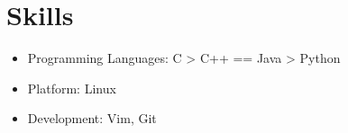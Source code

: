\documentclass{resume}
\begin{document}

\section{Skills}
\begin{itemize}[parsep=0.5ex]
  \item Programming Languages: C > C++ == Java > Python
  \item Platform: Linux
  \item Development: Vim, Git
\end{itemize}



%
%
\end{document}

